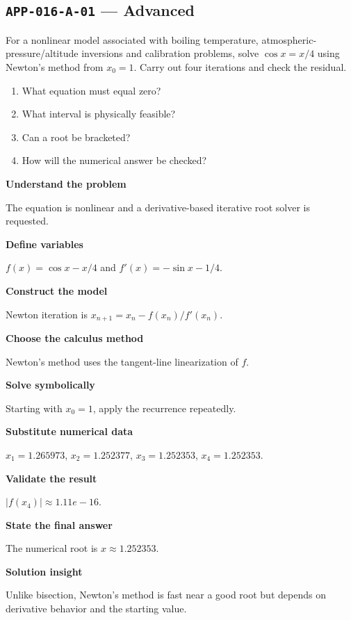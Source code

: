 \documentclass[11pt]{book}
\newcommand{\pid}[1]{\texttt{#1}}
\begin{document}
\subsection*{\pid{APP-016-A-01} — Advanced}
\begin{problembox}
For a nonlinear model associated with boiling temperature, atmospheric-pressure/altitude inversions and calibration problems, solve $\cos x=x/4$ using Newton's method from $x_0=1$. Carry out four iterations and check the residual.
\end{problembox}
\begin{promptbox}\begin{enumerate}
\item What equation must equal zero?
\item What interval is physically feasible?
\item Can a root be bracketed?
\item How will the numerical answer be checked?
\end{enumerate}\end{promptbox}
\begin{solutionbox}
\textbf{Understand the problem}\par The equation is nonlinear and a derivative-based iterative root solver is requested.\par\medskip
\textbf{Define variables}\par $f(x)=\cos x-x/4$ and $f'(x)=-\sin x-1/4$.\par\medskip
\textbf{Construct the model}\par Newton iteration is $x_{n+1}=x_n-f(x_n)/f'(x_n)$.\par\medskip
\textbf{Choose the calculus method}\par Newton’s method uses the tangent-line linearization of $f$.\par\medskip
\textbf{Solve symbolically}\par Starting with $x_0=1$, apply the recurrence repeatedly.\par\medskip
\textbf{Substitute numerical data}\par $x_1=1.265973$, $x_2=1.252377$, $x_3=1.252353$, $x_4=1.252353$.\par\medskip
\textbf{Validate the result}\par $|f(x_4)|\approx 1.11e-16$.\par\medskip
\textbf{State the final answer}\par The numerical root is $x\approx 1.252353$.\par\medskip
\textbf{Solution insight}\par Unlike bisection, Newton’s method is fast near a good root but depends on derivative behavior and the starting value.\par\medskip
\end{solutionbox}
\end{document}
